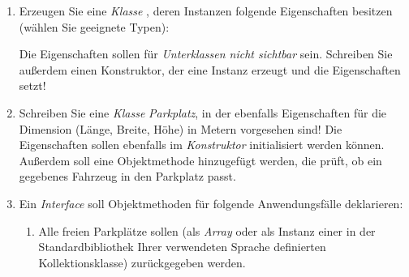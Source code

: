 \documentclass{bschlangaul-aufgabe}
\begin{document}
\begin{enumerate}


\item Erzeugen Sie eine \emph{Klasse}
, deren Instanzen folgende Eigenschaften besitzen
(wählen Sie geeignete Typen):


Die Eigenschaften sollen für \emph{Unterklassen nicht sichtbar} sein.
Schreiben Sie außerdem einen Konstruktor, der eine Instanz erzeugt und
die Eigenschaften setzt!

\begin{bAntwort}
\end{bAntwort}


\item Schreiben Sie eine \emph{Klasse} \emph{Parkplatz}, in der
ebenfalls Eigenschaften für die Dimension (Länge, Breite, Höhe) in
Metern vorgesehen sind! Die Eigenschaften sollen ebenfalls im
\emph{Konstruktor} initialisiert werden können. Außerdem soll eine
Objektmethode hinzugefügt werden, die prüft, ob ein gegebenes Fahrzeug
in den Parkplatz passt.

\begin{bAntwort}
\end{bAntwort}


\item Ein \emph{Interface}  soll Objektmethoden für
folgende Anwendungsfälle deklarieren:

\begin{enumerate}


\item Alle freien Parkplätze sollen (\zB als \emph{Array} oder als
Instanz einer in der Standardbibliothek Ihrer verwendeten Sprache
definierten Kollektionsklasse) zurückgegeben werden.


\end{enumerate}
\end{enumerate}
\end{document}
